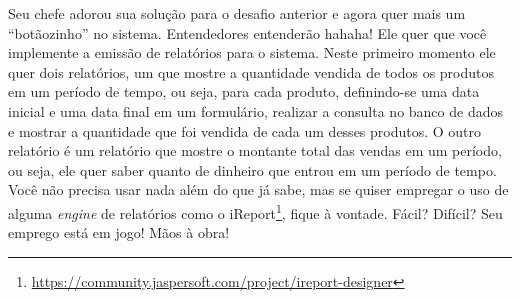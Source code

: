 \begin{desafioSemArquivo}{}{}{}
    Seu chefe adorou sua solução para o desafio anterior e agora quer mais um ``botãozinho'' no sistema. Entendedores entenderão hahaha! Ele quer que você implemente a emissão de relatórios para o sistema. Neste primeiro momento ele quer dois relatórios, um que mostre a quantidade vendida de todos os produtos em um período de tempo, ou seja, para cada produto, definindo-se uma data inicial e uma data final em um formulário, realizar a consulta no banco de dados e mostrar a quantidade que foi vendida de cada um desses produtos. O outro relatório é um relatório que mostre o montante total das vendas em um período, ou seja, ele quer saber quanto de dinheiro que entrou em um período de tempo. Você não precisa usar nada além do que já sabe, mas se quiser empregar o uso de alguma \textit{engine} de relatórios como o iReport\footnote{\url{https://community.jaspersoft.com/project/ireport-designer}}, fique à vontade. Fácil? Difícil? Seu emprego está em jogo! Mãos à obra!
\end{desafioSemArquivo}